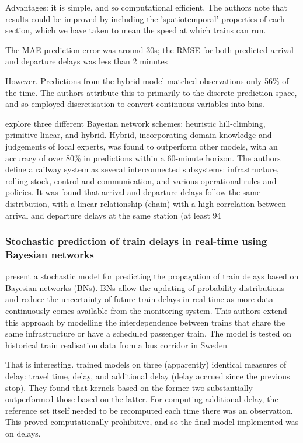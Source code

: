 \documentclass{article}
\begin{document}
Advantages: it is simple, and so computational efficient.
The authors note that results could be improved by including the 'spatiotemporal' properties of each section, which we have taken to mean the speed at which trains can run. 

The MAE prediction error was around 30s; the RMSE for both predicted arrival and departure delays was less than 2 minutes

However. Predictions from the hybrid model matched observations only 56\% of the time. The authors attribute this to primarily to the discrete prediction space, and so employed discretisation to convert continuous variables into bins.  

explore three different Bayesian network schemes: heuristic hill-climbing, primitive linear, and hybrid. Hybrid, incorporating domain knowledge and judgements of local experts, was found to outperform other models, with an accuracy of over 80\% in predictions within a 60-minute horizon. The authors define a railway system as several interconnected subsystems: infrastructure, rolling stock, control and communication, and various operational rules and policies. 
It was found that arrival and departure delays follow the same distribution, with a linear relationship (chain) with a high correlation between arrival and departure delays at the same station (at least 94%

\subsubsection{Stochastic prediction of train delays in real-time using Bayesian networks \cite{corman_kecman_2018}}

present a stochastic model for predicting the propagation of train delays based on Bayesian networks (BNs). BNs allow the updating of probability distributions and reduce the uncertainty of future train delays in real-time as more data continuously comes available from the monitoring system. This authors extend this approach by modelling the interdependence between trains that share the same infrastructure or have a scheduled passenger train. The model is tested on historical train realisation data from a bus corridor in Sweden

That is interesting. \cite{nair_et_al_2019} trained models on three (apparently) identical measures of delay: travel time, delay, and additional delay (delay accrued since the previous stop). They found that kernels based on the former two substantially outperformed those based on the latter. For computing additional delay, the reference set itself needed to be recomputed each time there was an observation. This proved computationally prohibitive, and so the final model implemented was on delays.
\end{document}
